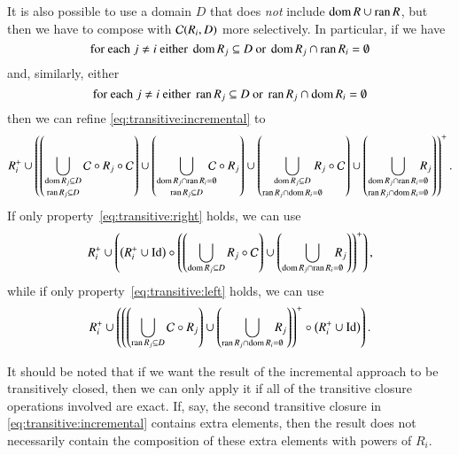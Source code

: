 It is also possible to use a domain $D$ that does {\em not\/}
include $\mathop{\rm dom}\nolimits R \cup \mathop{\rm ran}\nolimits R$, but then we have to
compose with ${\cal C}(R_i,D)$ more selectively.
In particular, if we have
\begin{equation}
\label{eq:transitive:right}
\text{for each $j \ne i$ either }
\mathop{\rm dom}\nolimits R_j \subseteq D \text{ or } \mathop{\rm dom}\nolimits R_j \cap \mathop{\rm ran}\nolimits R_i = \emptyset
\end{equation}
and, similarly, either
\begin{equation}
\label{eq:transitive:left}
\text{for each $j \ne i$ either }
\mathop{\rm ran}\nolimits R_j \subseteq D \text{ or } \mathop{\rm ran}\nolimits R_j \cap \mathop{\rm dom}\nolimits R_i = \emptyset
\end{equation}
then we can refine \eqref{eq:transitive:incremental} to
$$
R_i^+ \cup
\left(
\left(
\bigcup_{\shortstack{$\scriptstyle\domain R_j \subseteq D $\\
		     $\scriptstyle\range R_j \subseteq D$}}
{\cal C} \circ R_j \circ {\cal C}
\right)
\cup
\left(
\bigcup_{\shortstack{$\scriptstyle\domain R_j \cap \range R_i = \emptyset$\\
		     $\scriptstyle\range R_j \subseteq D$}}
\!\!\!\!\!
{\cal C} \circ R_j
\right)
\cup
\left(
\bigcup_{\shortstack{$\scriptstyle\domain R_j \subseteq D $\\
		     $\scriptstyle\range R_j \cap \domain R_i = \emptyset$}}
\!\!\!\!\!
R_j \circ {\cal C}
\right)
\cup
\left(
\bigcup_{\shortstack{$\scriptstyle\domain R_j \cap \range R_i = \emptyset$\\
		     $\scriptstyle\range R_j \cap \domain R_i = \emptyset$}}
\!\!\!\!\!
R_j
\right)
\right)^+
.
$$
If only property~\eqref{eq:transitive:right} holds,
we can use
$$
R_i^+ \cup
\left(
\left(
R_i^+ \cup \identity
\right)
\circ
\left(
\left(
\bigcup_{\shortstack{$\scriptstyle\domain R_j \subseteq D $}}
R_j \circ {\cal C}
\right)
\cup
\left(
\bigcup_{\shortstack{$\scriptstyle\domain R_j \cap \range R_i = \emptyset$}}
\!\!\!\!\!
R_j
\right)
\right)^+
\right)
,
$$
while if only property~\eqref{eq:transitive:left} holds,
we can use
$$
R_i^+ \cup
\left(
\left(
\left(
\bigcup_{\shortstack{$\scriptstyle\range R_j \subseteq D $}}
{\cal C} \circ R_j
\right)
\cup
\left(
\bigcup_{\shortstack{$\scriptstyle\range R_j \cap \domain R_i = \emptyset$}}
\!\!\!\!\!
R_j
\right)
\right)^+
\circ
\left(
R_i^+ \cup \identity
\right)
\right)
.
$$

It should be noted that if we want the result of the incremental
approach to be transitively closed, then we can only apply it
if all of the transitive closure operations involved are exact.
If, say, the second transitive closure in \eqref{eq:transitive:incremental}
contains extra elements, then the result does not necessarily contain
the composition of these extra elements with powers of $R_i$.

